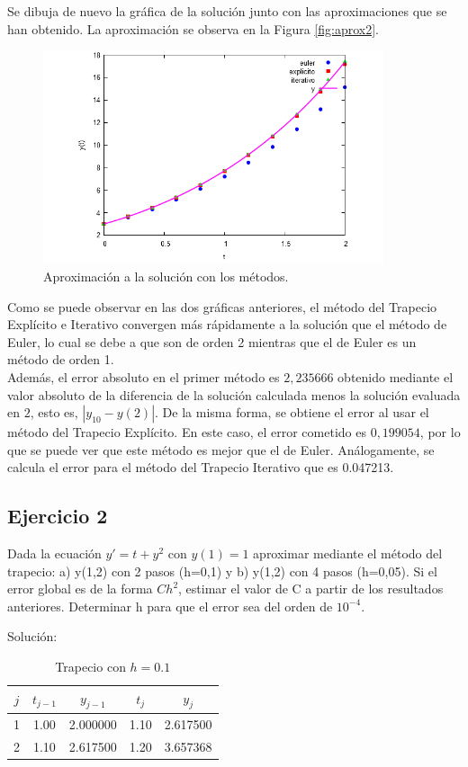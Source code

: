 \documentclass{article}
\theoremstyle{theorem-style}  %
\theoremstyle{definition-style}
\theoremstyle{example-style}
\begin{document}
Se dibuja de nuevo la gráfica de la solución junto con las aproximaciones que se han obtenido. La aproximación se observa en la Figura \ref{fig:aprox2}.

	\begin{figure}[H]
				\centering
				\includegraphics[width=10cm]{./Images/ejtp1-2.png}
				\caption{Aproximación a la solución con los métodos.}
	\end{figure}

Como se puede observar en las dos gráficas anteriores, el método del Trapecio Explícito e Iterativo convergen más rápidamente a la solución que el método de Euler, lo cual se debe a que son de orden 2 mientras que el de Euler es un método de orden 1.\\

Además, el error absoluto en el primer método es $2,235666$ obtenido mediante el valor absoluto de la diferencia de la solución calculada menos la solución evaluada en $2$, esto es, $|y_{10} - y(2)|$. De la misma forma, se obtiene el error al usar el método del Trapecio Explícito. En este caso, el error cometido es $0,199054$, por lo que se puede ver que este método es mejor que el de Euler. Análogamente, se calcula el error para el método del Trapecio Iterativo que es 0.047213.

\subsection{Ejercicio 2} \label{ejtp2}

Dada la ecuación $y'=t+y^2$ con $y(1)=1$ aproximar mediante el método del trapecio: a) y(1,2) con 2 pasos (h=0,1) y b) y(1,2) con 4 pasos (h=0,05). Si el error global es de la forma $Ch^2$, estimar el valor de C a partir de los resultados anteriores. Determinar h para que el error sea del orden de $10^{-4}$.

Solución:

    \begin{table}[H]
		\centering
		\begin{tabular}{|| c | c | c | c | c ||}
			\hline
			\hline $j$ &  $t_{j-1}$ & $y_{j-1}$ & $t_j$ & $y_j$ \\
			\hline 1 & 1.00 & 2.000000 & 1.10 & 2.617500 \\
			\hline 2 & 1.10 & 2.617500 & 1.20 & 3.657368 \\
			\hline
			\hline
		\end{tabular}
		\caption{Trapecio con $h=0.1$}
		\label{table:trapecio-ej2}
	\end{table}
\end{document}

